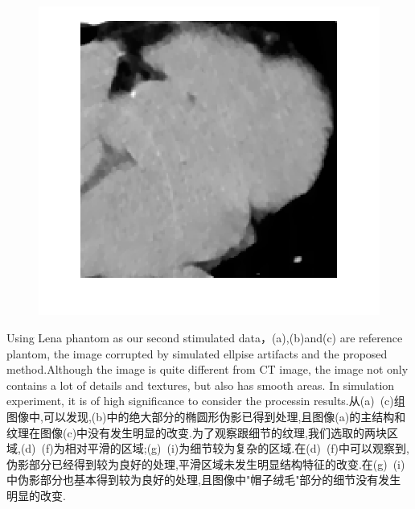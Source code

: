 \documentclass[hyperref]{ctexart}
\begin{document}
{\begin{figure}[htbp]
{				\includegraphics[scale=0.2]{333-2.png}
			}
			\quad
			\quad
		\end{figure}
		
		\begin{multicols}{2}
			Using Lena phantom as our second stimulated data，(a),(b)and(c) are reference plantom, the image corrupted by simulated ellpise artifacts and  the proposed method.Although the image is quite different from CT image, the image not only contains a lot of details and textures, but also has smooth areas. In simulation experiment, it is of high significance to consider the processin results.从(a)~(c)组图像中,可以发现,(b)中的绝大部分的椭圆形伪影已得到处理,且图像(a)的主结构和纹理在图像(c)中没有发生明显的改变.为了观察跟细节的纹理,我们选取的两块区域,(d)~(f)为相对平滑的区域;(g)~(i)为细节较为复杂的区域.在(d)~(f)中可以观察到,伪影部分已经得到较为良好的处理,平滑区域未发生明显结构特征的改变.在(g)~(i)中伪影部分也基本得到较为良好的处理,且图像中"帽子绒毛"部分的细节没有发生明显的改变.
			

\end{multicols}}
\end{document}

